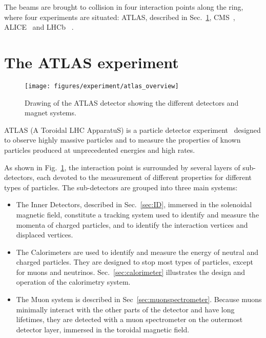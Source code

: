 The beams are brought to collision in four interaction points along
the ring, where four experiments are situated: 
ATLAS, described in Sec.~\ref{sec:ATLAS}, CMS~\cite{cms}, ALICE~\cite{alice} and LHCb~\cite{lhcb} .

\section{The ATLAS experiment}
\label{sec:ATLAS}

\begin{figure}[h]
\begin{center}
\texttt{[image: figures/experiment/atlas\_overview]}
\caption[Drawing of the ATLAS detector]{
  Drawing of the ATLAS detector showing the different detectors and magnet systems.}
\label{fig:ATLAS}
\end{center}
\end{figure}

ATLAS (A Toroidal LHC ApparatuS) is a particle detector
experiment~\cite{detectorpaper} designed to observe highly massive
particles and to measure the properties of known particles produced at
unprecedented energies and high rates. 

As shown in Fig.~\ref{fig:ATLAS}, the interaction point is surrounded
by several layers of sub-detectors, each devoted to the measurement of
different properties for different types of particles.
The sub-detectors are grouped into three main systems:

\begin{itemize}
\item The Inner Detectors, described in Sec.~\ref{sec:ID}, immersed in
  the solenoidal magnetic field, constitute a tracking system used to
  identify and measure the momenta of charged particles, and to identify
  the interaction vertices and displaced vertices. 
\item The Calorimeters are used to identify and measure the energy of
  neutral and charged particles. They are designed to stop most types
  of particles, except for muons and
  neutrinos. Sec.~\ref{sec:calorimeter} illustrates the design and
  operation of the calorimetry system.
\item The Muon system is described in
  Sec~\ref{sec:muonspectrometer}. Because muons minimally interact
  with the other parts of the detector and have long lifetimes, they
  are detected with a muon spectrometer on the outermost detector
  layer, immersed in the toroidal magnetic field. 
\end{itemize}

